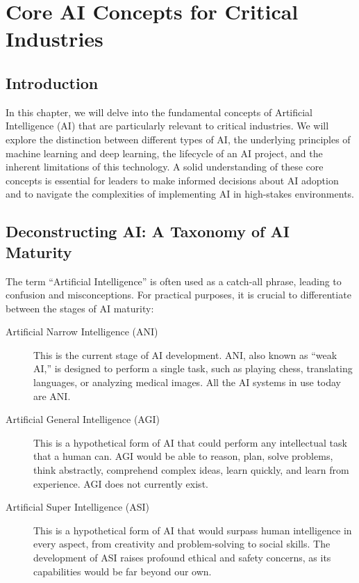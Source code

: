 \chapter{Core AI Concepts for Critical Industries}
\label{chap:core_ai_concepts_for_critical_industries}

\section{Introduction}
\label{sec:core_ai_introduction}
In this chapter, we will delve into the fundamental concepts of Artificial Intelligence (AI) that are particularly relevant to critical industries. We will explore the distinction between different types of AI, the underlying principles of machine learning and deep learning, the lifecycle of an AI project, and the inherent limitations of this technology. A solid understanding of these core concepts is essential for leaders to make informed decisions about AI adoption and to navigate the complexities of implementing AI in high-stakes environments.

\section{Deconstructing AI: A Taxonomy of AI Maturity}
\label{sec:deconstructing_ai}
The term ``Artificial Intelligence'' is often used as a catch-all phrase, leading to confusion and misconceptions. For practical purposes, it is crucial to differentiate between the stages of AI maturity:

\begin{description}
    \item[Artificial Narrow Intelligence (ANI)] This is the current stage of AI development. ANI, also known as ``weak AI,'' is designed to perform a single task, such as playing chess, translating languages, or analyzing medical images. All the AI systems in use today are ANI.
    \item[Artificial General Intelligence (AGI)] This is a hypothetical form of AI that could perform any intellectual task that a human can. AGI would be able to reason, plan, solve problems, think abstractly, comprehend complex ideas, learn quickly, and learn from experience. AGI does not currently exist.
    \item[Artificial Super Intelligence (ASI)] This is a hypothetical form of AI that would surpass human intelligence in every aspect, from creativity and problem-solving to social skills. The development of ASI raises profound ethical and safety concerns, as its capabilities would be far beyond our own.
\end{description}


